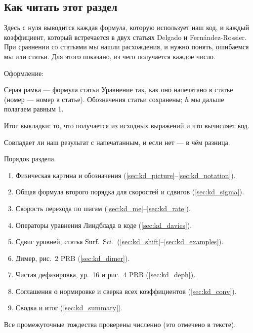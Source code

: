 
\subsection*{Как читать этот раздел}

Здесь с нуля выводится каждая формула, которую использует наш код, и каждый
коэффициент, который встречается в двух статьях Delgado и
Fern\'andez-Rossier. При сравнении со статьями мы нашли расхождения, и нужно
понять, ошибаемся мы или статьи. Для этого показано, из чего получается
каждое число.

Оформление:
\begin{paperbox}{Серая рамка --- формула статьи}
Уравнение так, как оно напечатано в статье (номер --- номер в статье).
Обозначения статьи сохранены; $\hbar$ мы дальше полагаем равным 1.
\end{paperbox}
\begin{resbox}
Итог выкладки: то, что получается из исходных выражений и что вычисляет код.
\end{resbox}
\begin{cmpbox}
Совпадает ли наш результат с напечатанным, и если нет --- в чём разница.
\end{cmpbox}

Порядок раздела.
\begin{enumerate}
\item Физическая картина и обозначения (\ref{sec:kd_picture}--\ref{sec:kd_notation}).
\item Общая формула второго порядка для скоростей и сдвигов (\ref{sec:kd_sigma}).
\item Скорость перехода по шагам (\ref{sec:kd_me}--\ref{sec:kd_rate}).
\item Операторы уравнения Линдблада в коде (\ref{sec:kd_davies}).
\item Сдвиг уровней, статья Surf.\ Sci.\ (\ref{sec:kd_shift}--\ref{sec:kd_examples}).
\item Димер, рис.~2 PRB (\ref{sec:kd_dimer}).
\item Чистая дефазировка, ур.~16 и рис.~4 PRB (\ref{sec:kd_deph}).
\item Соглашения о нормировке и сверка всех коэффициентов (\ref{sec:kd_conv}).
\item Сводка и итог (\ref{sec:kd_summary}).
\end{enumerate}
Все промежуточные тождества проверены численно (это отмечено в тексте).

